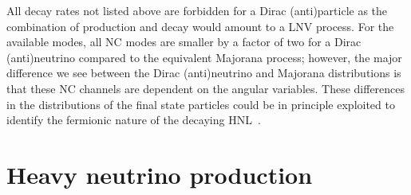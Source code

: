 %

All decay rates not listed above are forbidden for a Dirac (anti)particle as the combination of production %
and decay would amount to a LNV process.
% 
For the available modes, all NC modes are smaller by a factor of two for a Dirac (anti)neutrino compared %
to the equivalent Majorana process; however, the major difference we see between the Dirac (anti)neutrino and Majorana distributions %
is that these NC channels are dependent on the angular variables.
These differences in the distributions of the final state particles could be in principle exploited to identify %
the fermionic nature of the decaying HNL~\cite{Balantekin:2018ukw}.
\section{Heavy neutrino production}
\label{sec:production}

